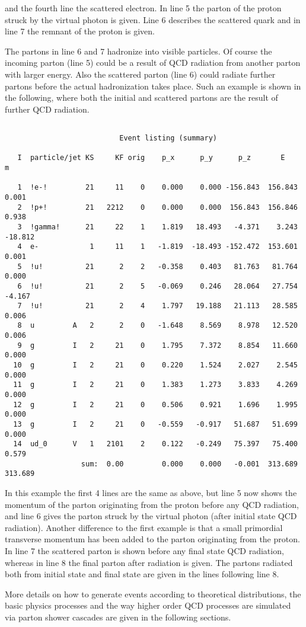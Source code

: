 \documentclass[10pt]{article} \usepackage{dina4}
\begin{document}
 and the fourth line  the scattered electron.
 In line 5 the parton of the proton struck by
the virtual photon is given. Line 6 
describes the scattered quark and in line 7
the remnant of the proton is given.
\par
The partons in line 6 and 7 hadronize into visible particles. Of course 
the incoming parton (line 5) could be a result of QCD radiation 
from another parton with larger energy. Also the scattered parton (line 6)
could radiate further partons before the actual hadronization takes place.
Such an example is shown in the following, where both the initial and 
scattered partons are the result of further QCD radiation.
\newpage
{\small \begin{verbatim}

                           Event listing (summary)

   I  particle/jet KS     KF orig    p_x      p_y      p_z       E        m

   1  !e-!         21     11    0    0.000    0.000 -156.843  156.843    0.001
   2  !p+!         21   2212    0    0.000    0.000  156.843  156.846    0.938
   3  !gamma!      21     22    1    1.819   18.493   -4.371    3.243  -18.812
   4  e-            1     11    1   -1.819  -18.493 -152.472  153.601    0.001
   5  !u!          21      2    2   -0.358    0.403   81.763   81.764    0.000
   6  !u!          21      2    5   -0.069    0.246   28.064   27.754   -4.167
   7  !u!          21      2    4    1.797   19.188   21.113   28.585    0.006
   8  u         A   2      2    0   -1.648    8.569    8.978   12.520    0.006
   9  g         I   2     21    0    1.795    7.372    8.854   11.660    0.000
  10  g         I   2     21    0    0.220    1.524    2.027    2.545    0.000
  11  g         I   2     21    0    1.383    1.273    3.833    4.269    0.000
  12  g         I   2     21    0    0.506    0.921    1.696    1.995    0.000
  13  g         I   2     21    0   -0.559   -0.917   51.687   51.699    0.000
  14  ud_0      V   1   2101    2    0.122   -0.249   75.397   75.400    0.579
                  sum:  0.00         0.000    0.000   -0.001  313.689  313.689
\end{verbatim} }
In this example the first 4 lines are the same as above, but line 5 now 
shows the momentum of the parton originating 
from the proton before any QCD radiation,
and line 6 gives the parton struck by the virtual photon 
(after initial state
QCD radiation). Another difference to the first example is that  a small
primordial transverse momentum has been  added 
to the parton originating from the
proton. In line 7  the scattered parton is shown before any
final state QCD radiation, whereas in line 8 the final parton after 
radiation is given. The partons radiated both from initial state and final
 state are given in the lines following line 8.
\par
More details on how to generate events according to theoretical distributions,
the basic physics processes and the way higher order QCD processes are
simulated via parton shower cascades are given in the following sections.
  
\end{document}
